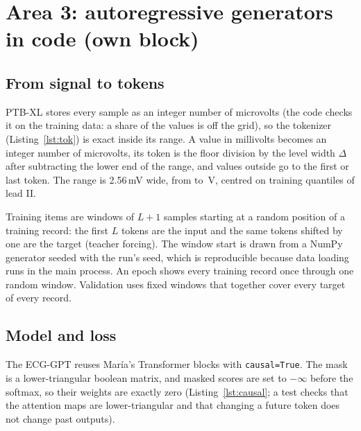 \section{Area 3: autoregressive generators in code (own block)}\label{sec:generative-code}

\subsection{From signal to tokens}

PTB-XL stores every sample as an integer number of microvolts (the code checks it on the training data:
a share \generativeFracOffUvGridTrain{} of the values is off the grid), so the tokenizer
(Listing~\ref{lst:tok}) is exact inside its range. A value in millivolts becomes an integer number of
microvolts, its token is the floor division by the level width $\Delta$ after subtracting the lower end of
the range, and values outside go to the first or last token. The range is 2.56\,mV wide, from
\generativeRangeLoUv{} to \generativeRangeHiUv{}\,\textmu V, centred on training quantiles of lead II.



Training items are windows of $L+1$ samples starting at a random position of a training record: the
first $L$ tokens are the input and the same tokens shifted by one are the target (teacher forcing). The
window start is drawn from a NumPy generator seeded with the run's seed, which is reproducible because
data loading runs in the main process. An epoch shows every training record once through one random
window. Validation uses fixed windows that together cover every target of every record.

\subsection{Model and loss}

The ECG-GPT reuses Mar\'ia's Transformer blocks with \texttt{causal=True}. The mask is a lower-triangular
boolean matrix, and masked scores are set to $-\infty$ before the softmax, so their weights are exactly
zero (Listing~\ref{lst:causal}; a test checks that the attention maps are lower-triangular and that
changing a future token does not change past outputs).

